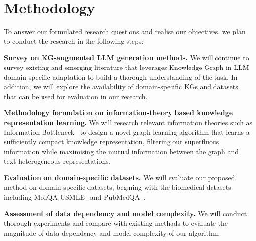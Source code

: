 \section*{Methodology}

To answer our formulated research questions and realise our objectives, we plan to conduct the research in the following steps:

\textbf{Survey on KG-augmented LLM generation methods. } 
We will continue to survey existing and emerging literature that leverages Knowledge Graph in LLM domain-specific adaptation to build a thorough understanding of the task. 
In addition, we will explore the availability of domain-specific KGs and datasets that can be used for evaluation in our research.


\textbf{Methodology formulation on information-theory based knowledge representation learning. } 
We will research relevant information theories such as Information Bottleneck~\parencite{IB, vib, gib} to design a novel graph learning algorithm that learns a sufficiently compact knowledge representation, filtering out superfluous information while maximising the mutual information between the graph and text heterogeneous representations.

\textbf{Evaluation on domain-specific datasets. } 
We will evaluate our proposed method on domain-specific datasets, begining with the biomedical datasets including MedQA-USMLE~\parencite{medqa} and PubMedQA~\parencite{pubmedqa}.

\textbf{Assessment of data dependency and model complexity. }
We will conduct thorough experiments and compare with existing methods to evaluate the magnitude of data dependency and model complexity of our algorithm. 


